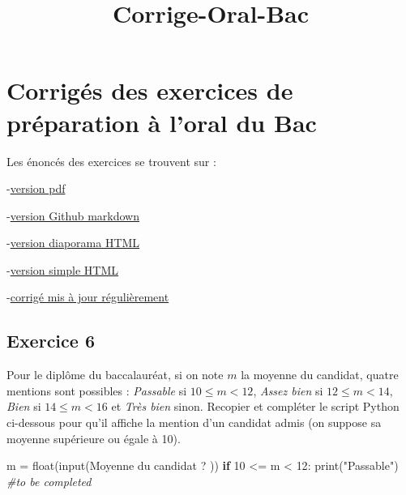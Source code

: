 \documentclass[11pt]{article}
\title{Corrige-Oral-Bac}
\newenvironment{Shaded}{}{}
\newcommand{\DecValTok}[1]{\textcolor[rgb]{0.25,0.63,0.44}{{#1}}}
\newcommand{\StringTok}[1]{\textcolor[rgb]{0.25,0.44,0.63}{{#1}}}
\newcommand{\CommentTok}[1]{\textcolor[rgb]{0.38,0.63,0.69}{\textit{{#1}}}}
\newcommand{\NormalTok}[1]{{#1}}
\newcommand{\ControlFlowTok}[1]{\textcolor[rgb]{0.00,0.44,0.13}{\textbf{{#1}}}}
\newcommand{\OperatorTok}[1]{\textcolor[rgb]{0.40,0.40,0.40}{{#1}}}
\newcommand{\BuiltInTok}[1]{{#1}}
\begin{document}
    
    
    \maketitle
    
    

    
    \hypertarget{corriguxe9s-des-exercices-de-pruxe9paration-uxe0-loral-du-bac}{%
\section{Corrigés des exercices de préparation à l'oral du
Bac}\label{corriguxe9s-des-exercices-de-pruxe9paration-uxe0-loral-du-bac}}

Les énoncés des exercices se trouvent sur :

-\href{OralBac/Preparation-oral-bac-.pdf}{version pdf}

-\href{OralBac/Preparation-oral-bac-git.md}{version Github markdown}

-\href{OralBac/Preparation-oral-bac-slidy.html}{version diaporama HTML}

-\href{OralBac/Preparation-oral-bac-.html}{version simple HTML}

-\href{https://mybinder.org/v2/gh/frederic-junier/ISN/master?filepath=OralBac/Corrige-Oral-Bac.ipynb}{corrigé
mis à jour régulièrement}

    \hypertarget{exercice-6}{%
\subsection{Exercice 6}\label{exercice-6}}

Pour le diplôme du baccalauréat, si on note \(m\) la moyenne du
candidat, quatre mentions sont possibles : \emph{Passable} si
\(10 \leqslant m < 12\), \emph{Assez bien} si \(12 \leqslant m < 14\),
\emph{Bien} si \(14 \leqslant m < 16\) et \emph{Très bien} sinon.
Recopier et compléter le script Python ci-dessous pour qu'il affiche la
mention d'un candidat admis (on suppose sa moyenne supérieure ou égale à
10).

\begin{Shaded}
\begin{Highlighting}[]
\NormalTok{m }\OperatorTok{=} \BuiltInTok{float}\NormalTok{(}\BuiltInTok{input}\NormalTok{(}\StringTok{\textquotesingle{}Moyenne du candidat ? \textquotesingle{}}\NormalTok{))}
\ControlFlowTok{if} \DecValTok{10} \OperatorTok{<=}\NormalTok{ m }\OperatorTok{<} \DecValTok{12}\NormalTok{:}
    \BuiltInTok{print}\NormalTok{(}\StringTok{"Passable"}\NormalTok{)}
\CommentTok{\#to be completed}
\end{Highlighting}
\end{Shaded}
\end{document}
